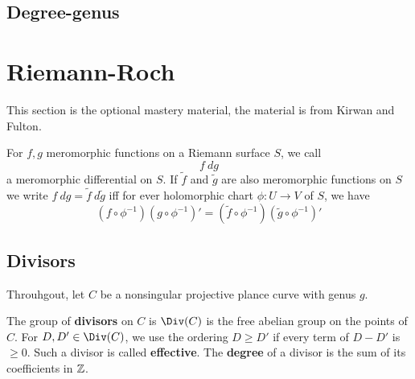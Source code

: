 \documentclass{article}
\begin{document}
\subsection{Degree-genus}

\newpage

\section{Riemann-Roch}

This section is the optional mastery material, the material is from Kirwan and Fulton.

\begin{definition}
    For $f,g$ meromorphic functions on a Riemann surface $S$, we call \[
    f \ dg
    \] a meromorphic differential on $S$. If $\tilde{f}$ and $\tilde{g}$ are also meromorphic functions on $S$ we write $f \ dg = \tilde{f} \ d\tilde{g}$ iff for ever holomorphic chart $\phi:U\rightarrow V$ of $S$, we have \[
    (f\circ\phi^{-1})(g\circ\phi^{-1})' = (\tilde{f}\circ\phi^{-1})(\tilde{g}\circ\phi^{-1})'
    \]
\end{definition}

\subsection{Divisors}

Throuhgout, let $C$ be a nonsingular projective plance curve with genus $g$.

\begin{definition}
    The group of \textbf{divisors} on $C$ is $\Div(C)$ is the free abelian group on the points of $C$. For $D,D'\in\Div(C)$, we use the ordering $D\geq D'$ if every term of $D-D'$ is $\geq 0$. Such a divisor is called \textbf{effective}. The \textbf{degree} of a divisor is the sum of its coefficients in $\mathbb{Z}$.
\end{definition}
\end{document}
